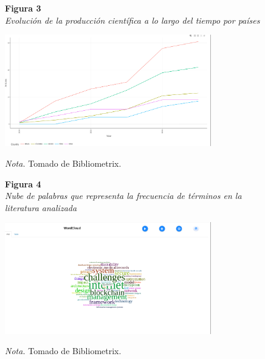 \documentclass[
    letterpaper, 
    man,   
    spanish,
    12pt,
    donotrepeattitle,
    floatsintext,
    hidelinks %
]{apa7}
\begin{document}
\begin{figure}[htbp]
    \begin{flushleft}
        \textbf{Figura 3}\\
        \textit{Evolución de la producción científica a lo largo del tiempo por países}
    \end{flushleft}
    \centering
    \includegraphics[width=0.8\textwidth]{Images/GraficoLineas.png}
    \vspace{0.5em}
    \begin{flushleft}
        \textit{Nota.} Tomado de Bibliometrix.
    \end{flushleft}
    \label{fig:grafico_lineas}
\end{figure}

\begin{figure}[htbp]
    \begin{flushleft}
        \textbf{Figura 4}\\
        \textit{Nube de palabras que representa la frecuencia de términos en la literatura analizada}
    \end{flushleft}
    \centering
    \includegraphics[width=0.8\textwidth]{Images/NubePalabras.png}
    \vspace{0.5em}
    \begin{flushleft}
        \textit{Nota.} Tomado de Bibliometrix.
    \end{flushleft}
    \label{fig:nube_palabras}
\end{figure}
\end{document}
